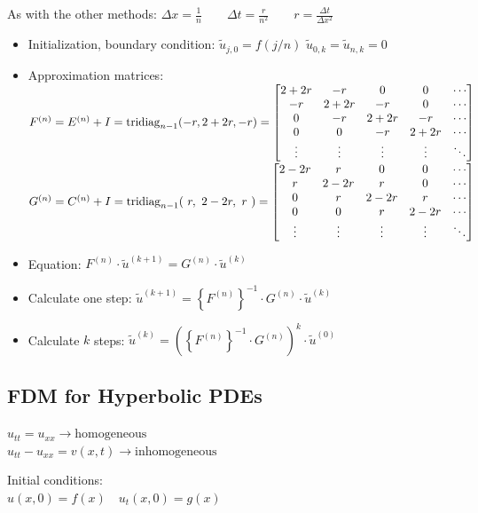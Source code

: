 As with the other methods: $\Delta x=\frac{1}{n} \qquad \Delta t=\frac{r}{n^2} \qquad \boxed{r=\frac{\Delta
t}{\Delta x^2}}$
\begin{itemize}
\item Initialization, boundary condition: $\tilde{u}_{j,0}=f(j/n)$ \qquad $\tilde{u}_{0,k}=\tilde{u}_{n,k}=0$
\item Approximation matrices:\\
$F^{(n)}=E^{(n)}+I=\operatorname{tridiag}_{n-1}(-r,2+2r,-r)=\begin{bmatrix}
2+2r& -r	& 0		& 0 	&\cdots\\
-r	& 2+2r  & -r	& 0		&\cdots\\
0	& -r	& 2+2r 	& -r 	&\cdots\\
0	& 0		& -r	& 2+2r 	&\cdots\\
\vdots&	\vdots&\vdots&\vdots&\ddots
\end{bmatrix}$\\
$G^{(n)}=C^{(n)}+I=\operatorname{tridiag}_{n-1}(~r,~2-2r,~r~)=\begin{bmatrix}
2-2r& r		& 0		& 0 	&\cdots\\
r	& 2-2r  & r		& 0		&\cdots\\
0	& r		& 2-2r 	& r 	&\cdots\\
0	& 0		& r		& 2-2r 	&\cdots\\
\vdots&	\vdots&\vdots&\vdots&\ddots
\end{bmatrix}$
\item Equation: $F^{(n)} \cdot \tilde{u}^{(k+1)}=G^{(n)} \cdot \tilde{u}^{(k)}$
\item Calculate one step: $\tilde{u}^{(k+1)}=\left\{F^{(n)}\right\}^{-1} \cdot G^{(n)}\cdot \tilde{u}^{(k)}$
\item Calculate $k$ steps: $\tilde{u}^{(k)}=\left(\left\{F^{(n)}\right\}^{-1} \cdot G^{(n)}\right)^{k}\cdot \tilde{u}^{(0)}$
\end{itemize}


\subsection{FDM for Hyperbolic PDEs}

\begin{minipage}{8cm}
$u_{tt}=u_{xx} \rightarrow \text{homogeneous}$\\
$u_{tt} -u_{xx}= v(x,t) \rightarrow \text{inhomogeneous}$
\end{minipage}
\begin{minipage}{5cm}
Initial conditions:\\
$u(x,0)=f(x) \quad u_t(x,0)=g(x)$
\end{minipage}\\

